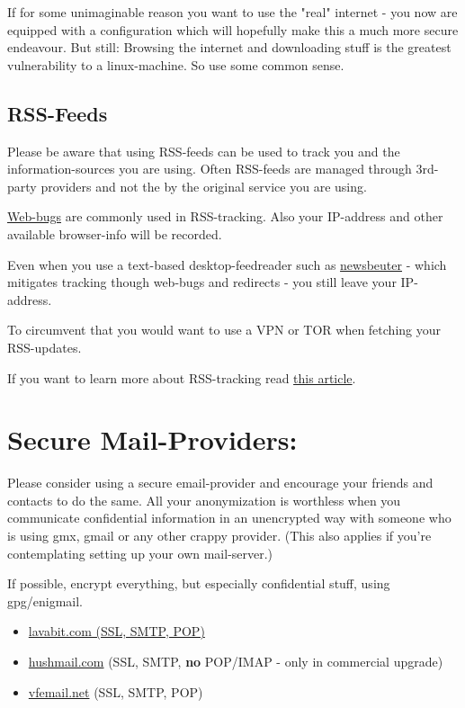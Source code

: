 \documentclass{article}
\begin{document}
 If for some unimaginable reason you want to use the "real" internet - you now are equipped with a configuration which will hopefully make this a much more secure endeavour. But still: Browsing the internet and downloading stuff is the greatest vulnerability to a linux-machine. So use some common sense. 
\subsection{RSS-Feeds}


 Please be aware that using RSS-feeds can be used to track you and the information-sources you are using. Often RSS-feeds are managed through 3rd-party providers and not the by the original service you are using. 


 \href{https://en.wikipedia.org/wiki/Web_bug}{Web-bugs} are commonly used in RSS-tracking. Also your IP-address and other available browser-info will be recorded.


 Even when you use a text-based desktop-feedreader such as \href{http://www.newsbeuter.org/}{newsbeuter} - which mitigates tracking though web-bugs and redirects - you still leave your IP-address. 


 To circumvent that you would want to use a VPN or TOR when fetching your RSS-updates.


 If you want to learn more about RSS-tracking read \href{http://www.feedforall.com/measuring-rss.htm}{this article}.
\section{Secure Mail-Providers:}


 Please consider using a secure email-provider and encourage your friends and contacts to do the same. All your anonymization is worthless when you communicate confidential information in an unencrypted way with someone who is using gmx, gmail or any other crappy provider. (This also applies if you're contemplating setting up your own mail-server.) 


 If possible, encrypt everything, but especially confidential stuff, using gpg/enigmail.
\begin{itemize}
	\item \href{https://lavabit.com/}{lavabit.com (SSL, SMTP, POP)}
	\item \href{hushmail.com}{hushmail.com} (SSL, SMTP, \textbf{no} POP/IMAP - only in commercial upgrade)
	\item \href{https://vfemail.net/}{vfemail.net} (SSL, SMTP, POP)
\end{itemize}
\end{document}
